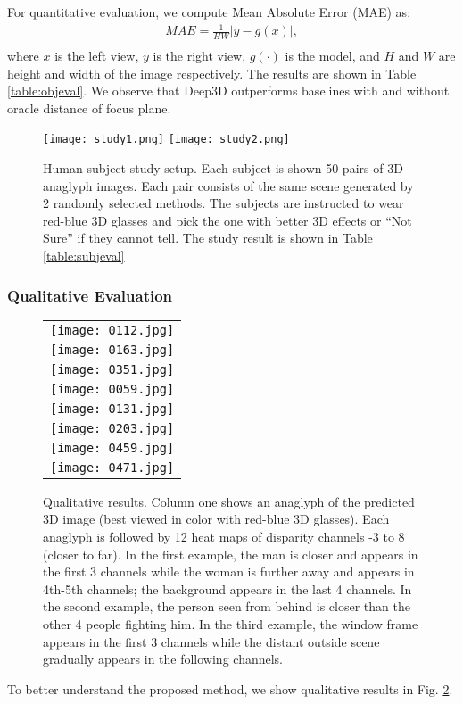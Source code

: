 \documentclass[runningheads]{llncs}
\begin{document}
For quantitative evaluation, we compute Mean Absolute Error (MAE) as:  
\begin{eqnarray}
MAE = \frac{1}{HW}\vert y - g(x) \vert, \\
\end{eqnarray}
where $x$ is the left view, $y$ is the right view, $g(\cdot)$ is the model, and $H$ and $W$ are height and width of the image respectively.
The results are shown in Table \ref{table:objeval}.
We observe that Deep3D outperforms baselines with and without oracle distance of focus plane.

\begin{figure}[t]
\texttt{[image: study1.png]}
\quad
\texttt{[image: study2.png]}
\caption{Human subject study setup. Each subject is shown 50 pairs of 3D anaglyph images.
Each pair consists of the same scene generated by 2 randomly selected methods.
The subjects are instructed to wear red-blue 3D glasses and pick the one with better 3D effects or ``Not Sure'' if they cannot tell.
The study result is shown in Table \ref{table:subjeval}}
\label{fig:study}
\end{figure}\subsubsection{Qualitative Evaluation}\begin{figure}[!p]
\begin{tabular}{c}
\texttt{[image: 0112.jpg]}\\
\texttt{[image: 0163.jpg]}\\
\texttt{[image: 0351.jpg]}\\
\texttt{[image: 0059.jpg]}\\
\texttt{[image: 0131.jpg]}\\
\texttt{[image: 0203.jpg]}\\
\texttt{[image: 0459.jpg]}\\
\texttt{[image: 0471.jpg]}\\
\end{tabular}
\captionsetup{font=tiny}
\vspace{-0.1in}
\caption{Qualitative results.
Column one shows an anaglyph of the predicted 3D image (best viewed in color with red-blue 3D glasses).
Each anaglyph is followed by 12 heat maps of disparity channels -3 to 8 (closer to far).
In the first example, the man is closer and appears in the first 3 channels while the woman is further away and appears in 4th-5th channels; the background appears in the last 4 channels.
In the second example, the person seen from behind is closer than the other 4 people fighting him.
In the third example, the window frame appears in the first 3 channels while the distant outside scene gradually appears in the following channels.}
\label{fig:depth}
\end{figure}To better understand the proposed method, we show qualitative results in Fig. \ref{fig:depth}.
\end{document}
